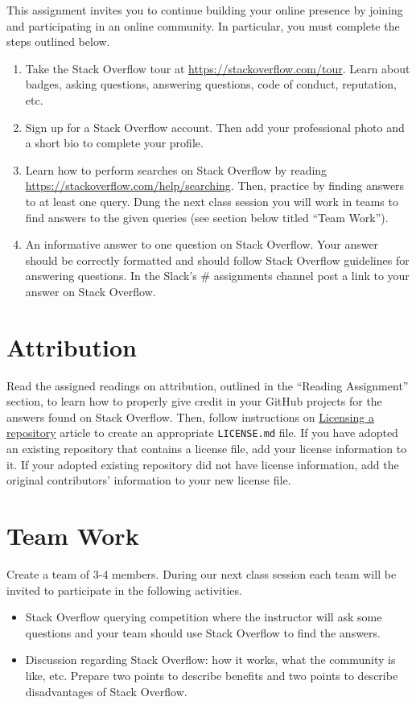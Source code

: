 \documentclass[11pt]{article}
\begin{document}
This assignment invites you to continue building your online presence by joining and participating in an online community. In particular, you must complete the  steps outlined below.
\vspace{-0.05in}
\begin{enumerate}
	\item Take the Stack Overflow tour at \url{https://stackoverflow.com/tour}. Learn about badges, asking questions, answering questions, code of conduct, reputation, etc. 
	\item Sign up for a Stack Overflow account. Then add your professional photo and a  short bio to complete your profile.
	\item Learn how to perform searches on Stack Overflow by reading \url{https://stackoverflow.com/help/searching}. Then, practice by finding answers to at least one query. Dung the next class session you will work in teams to find answers to the given queries (see section below titled ``Team Work'').
	\item An informative answer to one question on Stack Overflow. Your answer should be correctly formatted and should follow Stack Overflow guidelines for answering questions. In the Slack's \# assignments channel post a link to your answer on Stack Overflow.
\end{enumerate} 
\vspace{-0.05in}

\section*{Attribution}
Read the assigned readings on attribution, outlined in the ``Reading Assignment'' section, to learn how to properly give credit in your GitHub projects for the answers found on Stack Overflow.  Then, follow instructions on \href{https://help.github.com/articles/licensing-a-repository/}{Licensing a repository} article to create an appropriate {\tt LICENSE.md} file. If you have adopted an existing repository that contains a license file, add your license information to it. If your adopted existing repository did not have license information, add the original contributors' information to your new license file.

\section*{Team Work}
Create a team of 3-4 members. During our next class session each team will be invited to participate in the following activities.
\begin{itemize}
	\item Stack Overflow querying competition where the instructor will ask some questions and your team should use Stack Overflow to find the answers.
	\item Discussion regarding Stack Overflow: how it works, what the community is like, etc. Prepare two points to describe benefits and two points to describe disadvantages of Stack Overflow. 
\end{itemize}
\end{document}
